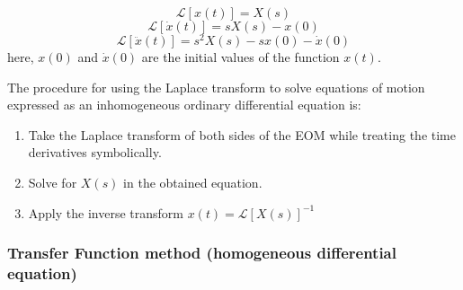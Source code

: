 \documentclass[12pt,letter]{article}
\numberwithin{ex}{section} %
\newcommand{\Laplace}[1]{\ensuremath{\mathcal{L}{\left[#1\right]}}}
\begin{document}
		\begin{equation}
			\Laplace{x(t)} = X(s)
		\end{equation}		
		\begin{equation}
			\Laplace{\dot{x}(t)} = sX(s)-x(0)
		\end{equation}	
		\begin{equation}
			\Laplace{\ddot{x}(t)} = s^2X(s)-sx(0) - \dot{x}(0)
		\end{equation}	
		here, $x(0)$ and $\dot{x}(0)$ are the initial values of the function $x(t)$. 
		


The procedure for using the Laplace transform to solve equations of motion expressed as an inhomogeneous ordinary differential equation is:
\begin{enumerate}
	\item Take the Laplace transform of both sides of the EOM while treating the time derivatives symbolically.
	\item Solve for $X(s)$ in the obtained equation.
	\item Apply the inverse transform $x(t) = \Laplace{X(s)}^{-1}$
\end{enumerate}

\subsubsection{Transfer Function method (homogeneous differential equation)}
\end{document}
